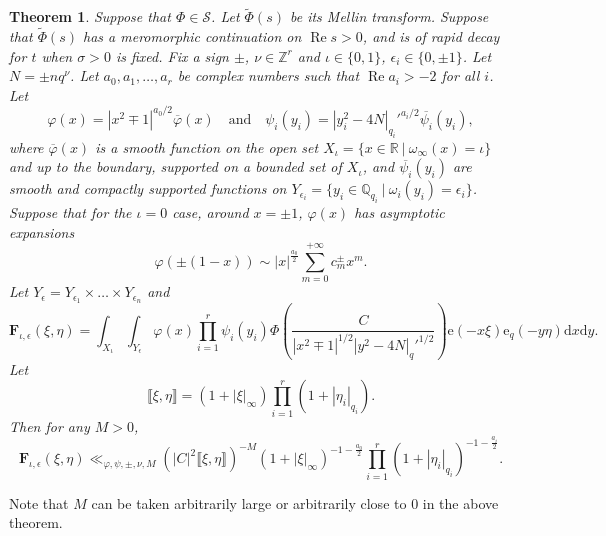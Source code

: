 \documentclass[10pt,oneside,reqno]{amsart}
\newcommand\rmd{\mathrm{d}}
\newcommand\rme{\mathrm{e}}
\newcommand\cS{\mathcal{S}}
\newcommand\bF{\mathbf{F}}
\newcommand\QQ{\mathbb{Q}}
\newcommand\RR{\mathbb{R}}
\newcommand\ZZ{\mathbb{Z}}
\renewcommand\Re{\mathop{\mathrm{Re}}}
\newcommand\legendresymbol[2]{\genfrac{(}{)}{}{}{#1}{#2}}
\theoremstyle{THEOREM}
\newtheorem{theorem}{Theorem}[section]
\theoremstyle{DEFINITION}
\theoremstyle{EXERCISE}
\numberwithin{equation}{section}
\begin{document}
\begin{theorem}\label{thm:mainfourierestimate}
Suppose that $\Phi\in \cS$. Let $\widetilde{\Phi}(s)$ be its Mellin transform. Suppose that $\widetilde{\Phi}(s)$ has a meromorphic continuation on $\Re s>0$, and is of rapid decay for $t$ when $\sigma>0$ is fixed. Fix a sign $\pm$, $\nu\in \ZZ^r$ and $\iota\in \{0,1\}$, $\epsilon_i\in \{0,\pm 1\}$. Let $N=\pm nq^\nu$. Let $a_0,a_1,\dots,a_r$ be complex numbers such that $\Re a_i>-2$ for all $i$. Let 
\[
\varphi(x)=|x^2\mp 1|^{a_0/2} \overline{\varphi}(x)\quad\text{and}\quad \psi_i(y_i)=|y_i^2-4N|_{q_i}'^{a_i/2} \overline{\psi_i}(y_i),
\]
where $\overline{\varphi}(x)$ is a smooth function on the open set $X_{\iota}=\{x\in \RR\ |\ \omega_\infty(x)=\iota\}$ and up to the boundary, supported on a bounded set of $X_{\iota}$, and $\overline{\psi_i}(y_i)$ are smooth and compactly supported functions on $Y_{\epsilon_i}=\{y_i\in \QQ_{q_i}\ |\ \omega_i(y_i)=\epsilon_i\}$. Suppose that for the $\iota=0$ case, around $x=\pm 1$, $\varphi(x)$ has asymptotic expansions
\[
\varphi(\pm(1-x))\sim |x|^{\frac{a_0}{2}}\sum_{m=0}^{+\infty}c_m^\pm x^m.
\]
Let $Y_\epsilon=Y_{\epsilon_1}\times\dots\times Y_{\epsilon_n}$ and 
\[
\bF_{\iota,\epsilon}(\xi,\eta)=\int_{X_\iota}\int_{Y_\epsilon}\varphi(x)\prod_{i=1}^{r}\psi_i(y_i)\Phi\legendresymbol{C}{|x^2\mp 1|^{1/2}|y^2-4N|_q'^{1/2}}\rme(-x\xi)\rme_{q}(-y\eta)\rmd x\rmd y.
\]
Let
\[
\llbracket\xi,\eta\rrbracket=(1+|\xi|_\infty)\prod_{i=1}^{r}(1+|\eta_i|_{q_i}).
\]
Then for any $M>0$,
  \[
  \bF_{\iota,\epsilon}(\xi,\eta)\ll_{\varphi,\psi,\pm,\nu,M}\left(|C|^2\llbracket\xi,\eta\rrbracket\right)^{-M} (1+|\xi|_\infty)^{-1-\frac{a_0}{2}}\prod_{i=1}^{r}(1+|\eta_i|_{q_i})^{-1-\frac{a_i}{2}}.
  \]
\end{theorem}
Note that $M$ can be taken arbitrarily large or arbitrarily close to $0$ in the above theorem.
\end{document}

